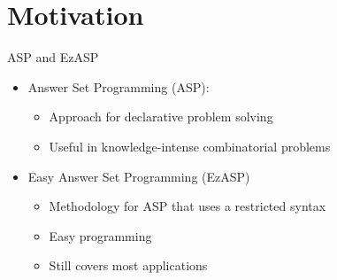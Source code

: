 \section{Motivation}

\begin{frame}{ASP and EzASP}
\begin{itemize}
  \vfill
  \item<1->\alert<1>{Answer Set Programming (ASP)}:
  \begin{itemize}
    \item Approach for declarative problem solving
    \item Useful in knowledge-intense combinatorial problems
  \end{itemize}
  \bigskip
  \bigskip
  \item<2->\alert<2>{Easy Answer Set Programming (EzASP)}
  \begin{itemize}
    \item Methodology for ASP that uses a restricted syntax
    \item Easy programming
    \item Still covers most applications
  \end{itemize}
  \vfill
\end{itemize}
\end{frame}


